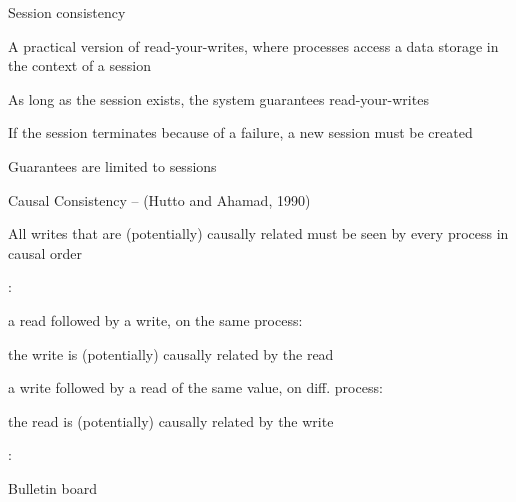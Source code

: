 \begin{frame}{Session consistency}

\begin{definition}
\BIL
\item A practical version of read-your-writes, where processes access a data storage
in the context of a session
\item As long as the session exists, the system guarantees read-your-writes
\item If the session terminates because of a failure, a new session must be
created
\item Guarantees are limited to sessions
\EIL
\end{definition}

\end{frame}

\begin{frame}{Causal Consistency -- (Hutto and Ahamad, 1990)}

\begin{definition}	
All writes that are (potentially) causally related must be seen by every process in causal order
\end{definition}

\bigskip
{}:

\BIL
\item a read followed by a write, on the same process: 
	\BI
	\item the write is (potentially) causally related by the read
	\EI
\item a write followed by a read of the same value, on diff. process: 
	\BI
	\item the read is (potentially) causally related by the write
	\EI
\EIL

\bigskip
{}:
\BI
\item Bulletin board
\EI

\end{frame}

